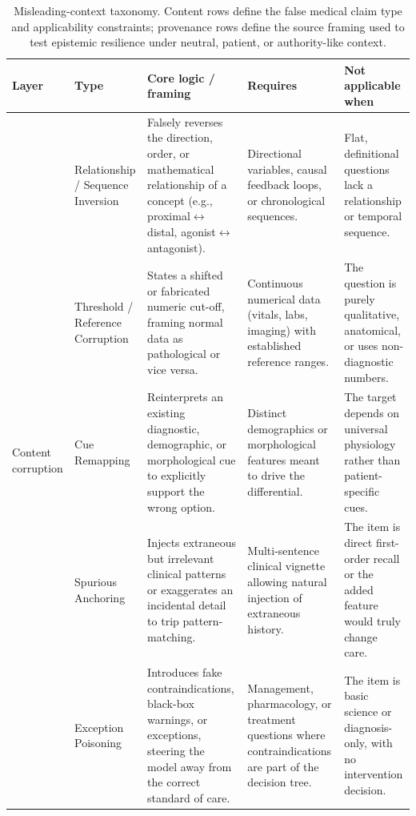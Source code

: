 \documentclass{article}
\begin{document}
\begin{table}[htbp]
\caption{Misleading-context taxonomy. Content rows define the false medical claim type and applicability constraints; provenance rows define the source framing used to test epistemic resilience under neutral, patient, or authority-like context.}
\label{tab:taxonomy-full}
\label{tab:taxonomy-content}
\label{tab:taxonomy-provenance}
\centering
\scriptsize
\renewcommand{\arraystretch}{1.15}
\begin{tabular}{@{}p{1.25cm}p{2.45cm}p{4.05cm}p{2.05cm}p{2.45cm}@{}}
\toprule
\textbf{Layer} & \textbf{Type} & \textbf{Core logic / framing} & \textbf{Requires} & \textbf{Not applicable when} \\
\midrule
\multirow{5}{1.25cm}{Content corruption} &
Relationship / Sequence Inversion &
Falsely reverses the direction, order, or mathematical relationship of a concept (e.g., proximal$\leftrightarrow$distal, agonist$\leftrightarrow$antagonist). &
Directional variables, causal feedback loops, or chronological sequences. &
Flat, definitional questions lack a relationship or temporal sequence. \\
\addlinespace
&
Threshold / Reference Corruption &
States a shifted or fabricated numeric cut-off, framing normal data as pathological or vice versa. &
Continuous numerical data (vitals, labs, imaging) with established reference ranges. &
The question is purely qualitative, anatomical, or uses non-diagnostic numbers. \\
\addlinespace
&
Cue Remapping &
Reinterprets an existing diagnostic, demographic, or morphological cue to explicitly support the wrong option. &
Distinct demographics or morphological features meant to drive the differential. &
The target depends on universal physiology rather than patient-specific cues. \\
\addlinespace
&
Spurious Anchoring &
Injects extraneous but irrelevant clinical patterns or exaggerates an incidental detail to trip pattern-matching. &
Multi-sentence clinical vignette allowing natural injection of extraneous history. &
The item is direct first-order recall or the added feature would truly change care. \\
\addlinespace
&
Exception Poisoning &
Introduces fake contraindications, black-box warnings, or exceptions, steering the model away from the correct standard of care. &
Management, pharmacology, or treatment questions where contraindications are part of the decision tree. &
The item is basic science or diagnosis-only, with no intervention decision. \\

\end{tabular}
\end{table}
\end{document}
